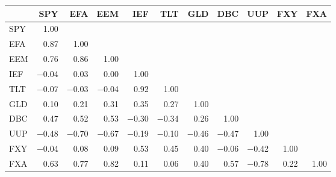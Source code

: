 \begin{tabular}{lrrrrrrrrrr}
\toprule
 & SPY & EFA & EEM & IEF & TLT & GLD & DBC & UUP & FXY & FXA \\
\midrule
SPY & 1.00 &  &  &  &  &  &  &  &  &  \\
EFA & 0.87 & 1.00 &  &  &  &  &  &  &  &  \\
EEM & 0.76 & 0.86 & 1.00 &  &  &  &  &  &  &  \\
IEF & $-$0.04 & 0.03 & 0.00 & 1.00 &  &  &  &  &  &  \\
TLT & $-$0.07 & $-$0.03 & $-$0.04 & 0.92 & 1.00 &  &  &  &  &  \\
GLD & 0.10 & 0.21 & 0.31 & 0.35 & 0.27 & 1.00 &  &  &  &  \\
DBC & 0.47 & 0.52 & 0.53 & $-$0.30 & $-$0.34 & 0.26 & 1.00 &  &  &  \\
UUP & $-$0.48 & $-$0.70 & $-$0.67 & $-$0.19 & $-$0.10 & $-$0.46 & $-$0.47 & 1.00 &  &  \\
FXY & $-$0.04 & 0.08 & 0.09 & 0.53 & 0.45 & 0.40 & $-$0.06 & $-$0.42 & 1.00 &  \\
FXA & 0.63 & 0.77 & 0.82 & 0.11 & 0.06 & 0.40 & 0.57 & $-$0.78 & 0.22 & 1.00 \\
\bottomrule
\end{tabular}
